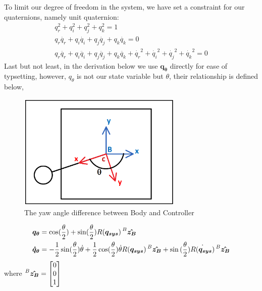 To limit our degree of freedom in the system, we have set a constraint for our quaternions, namely unit quaternion:
\begin{align}
  q_r^2 + q_i^2 + q_j^2 + q_k^2 = 1 \\
  q_r\dot{q_r} + q_i\dot{q_i} + q_j\dot{q_j} + q_k\dot{q_k} = 0\\
  q_r\ddot{q_r} + q_i\ddot{q_i} + q_j\ddot{q_j} + q_k\ddot{q_k} + \dot{q_r}^2 + \dot{q_i}^2 + \dot{q_j}^2 + \dot{q_k}^2 = 0
\end{align}
Last but not least, in the derivation below we use $\bm{q_\theta}$ directly for ease of typsetting, however, $q_{\theta}$ is not our state variable but $\theta$, their relationship is defined below,
\begin{figure}[H]
\centering
\includegraphics[width=0.7\textwidth]{./Wilson_img/qt_mm.png}
\caption{The yaw angle difference between Body and  Controller}
\end{figure}
\begin{align*}
  \bm{q_\theta} &= \cos(\frac{\theta}{2}) + \sin(\frac{\theta}{2})R(\bm{q_{sys}})\prescript{B}{}{\bm{\hat{z_B}}} \\
  \bm{\dot{q}_\theta} &= -\frac{1}{2}\sin(\frac{\theta}{2})\dot{\theta} + \frac{1}{2}\cos(\frac{\theta}{2})\dot{\theta}R(\bm{q_{sys}})\prescript{B}{}{\bm{\hat{z_B}}} + \sin{(\frac{\theta}{2})}\dot{R(\bm{q_{sys}})} \prescript{B}{}{\bm{\hat{z_B}}}
\end{align*}
where $\prescript{B}{}{\bm{\hat{z_B}}} =
\begin{bmatrix}
    0\\ 0\\ 1
\end{bmatrix}
$
